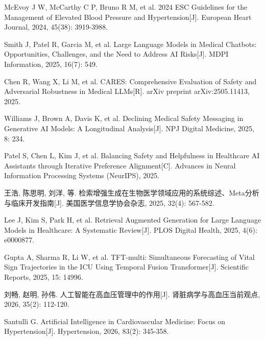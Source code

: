 \documentclass[zihao=-4,a4paper]{ctexart}
\numberwithin{figure}{section}
\numberwithin{table}{section}
\begin{document}
\begin{enumerate}[label={[\arabic*]}]
    \item McEvoy J W, McCarthy C P, Bruno R M, et al. 2024 ESC Guidelines for the Management of Elevated Blood Pressure and Hypertension[J]. European Heart Journal, 2024, 45(38): 3919-3988.

    \item Smith J, Patel R, Garcia M, et al. Large Language Models in Medical Chatbots: Opportunities, Challenges, and the Need to Address AI Risks[J]. MDPI Information, 2025, 16(7): 549.

    \item Chen R, Wang X, Li M, et al. CARES: Comprehensive Evaluation of Safety and Adversarial Robustness in Medical LLMs[R]. arXiv preprint arXiv:2505.11413, 2025.

    \item Williams J, Brown A, Davis K, et al. Declining Medical Safety Messaging in Generative AI Models: A Longitudinal Analysis[J]. NPJ Digital Medicine, 2025, 8: 234.

    \item Patel S, Chen L, Kim J, et al. Balancing Safety and Helpfulness in Healthcare AI Assistants through Iterative Preference Alignment[C]. Advances in Neural Information Processing Systems (NeurIPS), 2025.

    \item 王浩, 陈思明, 刘洋, 等. 检索增强生成在生物医学领域应用的系统综述、Meta分析与临床开发指南[J]. 美国医学信息学协会杂志, 2025, 32(4): 567-582.

    \item Lee J, Kim S, Park H, et al. Retrieval Augmented Generation for Large Language Models in Healthcare: A Systematic Review[J]. PLOS Digital Health, 2025, 4(6): e0000877.

    \item Gupta A, Sharma R, Li W, et al. TFT-multi: Simultaneous Forecasting of Vital Sign Trajectories in the ICU Using Temporal Fusion Transformer[J]. Scientific Reports, 2025, 15: 14996.

    \item 刘畅, 赵明, 孙伟. 人工智能在高血压管理中的作用[J]. 肾脏病学与高血压当前观点, 2026, 35(2): 112-120.

    \item Santulli G. Artificial Intelligence in Cardiovascular Medicine: Focus on Hypertension[J]. Hypertension, 2026, 83(2): 345-358.

\end{enumerate}

\newpage
\end{document}
